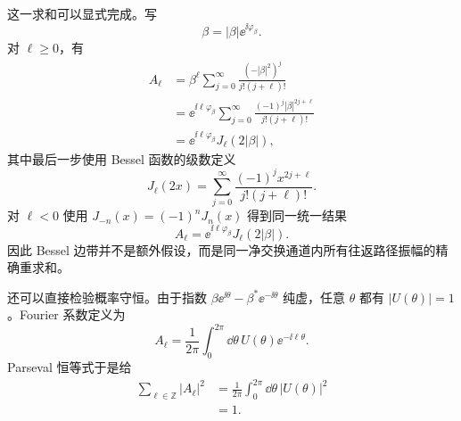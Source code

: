 \begin{derivation}[有限脉冲散射的侧带振幅]
这一求和可以显式完成。写
\[
 \beta=|\beta|\ee^{\ii\varphi_\beta}.
\]
对 $\ell\ge0$，有
\begin{align*}
 A_\ell
 &=\beta^\ell
 \sum_{j=0}^{\infty}
 \frac{(-|\beta|^2)^j}{j!(j+\ell)!}\\
 &=\ee^{\ii\ell\varphi_\beta}
 \sum_{j=0}^{\infty}
 \frac{(-1)^j|\beta|^{2j+\ell}}{j!(j+\ell)!}\\
 &=\ee^{\ii\ell\varphi_\beta}J_\ell(2|\beta|),
\end{align*}
其中最后一步使用 Bessel 函数的级数定义
\[
 J_\ell(2x)
 =\sum_{j=0}^{\infty}
 \frac{(-1)^j x^{2j+\ell}}{j!(j+\ell)!}.
\]
对 $\ell<0$ 使用 $J_{-n}(x)=(-1)^nJ_n(x)$ 得到同一统一结果
\begin{equation*}
 \boxed{
 A_\ell=\ee^{\ii\ell\varphi_\beta}J_\ell(2|\beta|).}
\end{equation*}
因此 Bessel 边带并不是额外假设，而是同一净交换通道内所有往返路径振幅的精确重求和。

还可以直接检验概率守恒。由于指数
$\beta \ee^{\ii\theta}-\beta^*\ee^{-\ii\theta}$
纯虚，任意 $\theta$ 都有 $|U(\theta)|=1$。Fourier 系数定义为
\begin{equation*}
 A_\ell=\frac{1}{2\pi}
 \int_0^{2\pi}\dd\theta\,
 U(\theta)\ee^{-\ii\ell\theta}.
\end{equation*}
Parseval 恒等式于是给
\begin{align*}
 \sum_{\ell\in\mathbb Z}|A_\ell|^2
 &=\frac{1}{2\pi}\int_0^{2\pi}\dd\theta\,|U(\theta)|^2\\
 &=1.
\end{align*}
\end{derivation}



